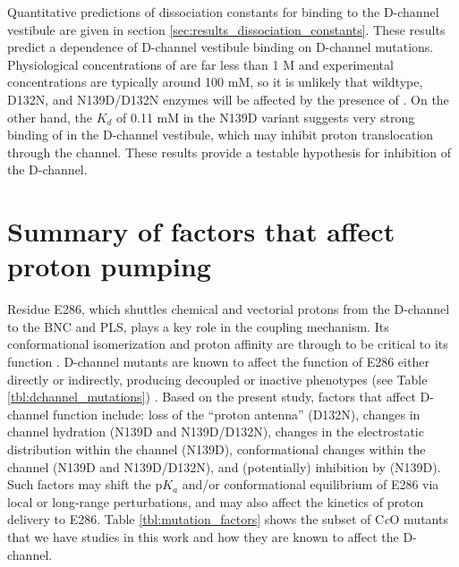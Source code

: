 Quantitative predictions of dissociation constants for  binding to the D-channel vestibule are given in section \ref{sec:results_dissociation_constants}. These results predict a dependence of  D-channel vestibule binding on D-channel mutations. Physiological concentrations of  are far less than 1 M and experimental concentrations are typically around 100 mM, so it is unlikely that wildtype, D132N, and N139D/D132N enzymes will be affected by the presence of . On the other hand, the $K_d$ of 0.11 mM in the N139D variant suggests very strong binding of  in the D-channel vestibule, which may inhibit proton translocation through the channel. These results provide a testable hypothesis for  inhibition of the D-channel.

\section{Summary of factors that affect proton pumping}

Residue E286, which shuttles chemical and vectorial protons from the D-channel to the BNC and PLS, plays a key role in the coupling mechanism. Its conformational isomerization and proton affinity are through to be critical to its function \cite{Pomes:1998p5611,Riistama:1997p8271}. D-channel mutants are known to affect the function of E286 either directly or indirectly, producing decoupled or inactive phenotypes (see Table \ref{tbl:dchannel_mutations}) \cite{Namslauer:2003p6853,Han:2006p5624,Branden:2006p9874,Fadda:2008p5482,Lee:2010p8614,Zhu:2010p8237}. Based on the present study, factors that affect D-channel function include: loss of the ``proton antenna'' (D132N), changes in channel hydration (N139D and N139D/D132N), changes in the electrostatic distribution within the channel (N139D), conformational changes within the channel (N139D and N139D/D132N), and (potentially) inhibition by  (N139D). Such factors may shift the p$K_a$ and/or conformational equilibrium of E286 via local or long-range perturbations, and may also affect the kinetics of proton delivery to E286. Table \ref{tbl:mutation_factors} shows the subset of C\emph{c}O mutants that we have studies in this work and how they are known to affect the D-channel.

